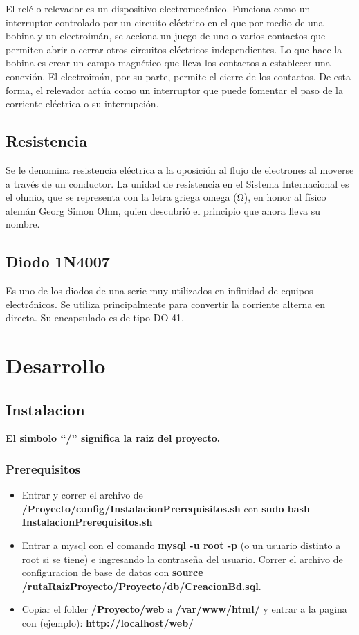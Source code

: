 \documentclass{article}
\begin{document}
El relé o relevador es un dispositivo electromecánico. Funciona como un interruptor controlado por un circuito eléctrico en el que por medio de una bobina y un electroimán, se acciona un juego de uno o varios contactos que permiten abrir o cerrar otros circuitos eléctricos independientes. Lo que hace la bobina es crear un campo magnético que lleva los contactos a establecer una conexión. El electroimán, por su parte, permite el cierre de los contactos. De esta forma, el relevador actúa como un interruptor que puede fomentar el paso de la corriente eléctrica o su interrupción. 

\subsection{Resistencia}

Se le denomina resistencia eléctrica a la oposición al flujo de electrones al moverse a través de un conductor. La unidad de resistencia en el Sistema Internacional es el ohmio, que se representa con la letra griega omega (Ω), en honor al físico alemán Georg Simon Ohm, quien descubrió el principio que ahora lleva su nombre.

\subsection{Diodo 1N4007}

Es uno de los diodos de una serie muy utilizados en infinidad de equipos electrónicos. Se utiliza principalmente para convertir la corriente alterna en directa. Su encapsulado es de tipo DO-41. 

\newpage
\section{Desarrollo}

\subsection{Instalacion}
\textbf{El simbolo ``/'' significa la raiz del proyecto.}

\subsubsection{Prerequisitos}

\begin{itemize}
	\item Entrar y correr el archivo de \textbf{/Proyecto/config/InstalacionPrerequisitos.sh} con \textbf{sudo bash InstalacionPrerequisitos.sh}
	\item Entrar a mysql con el comando \textbf{mysql -u root -p} (o un usuario distinto a root si se tiene) e ingresando la contrase\~na del usuario. Correr el archivo de configuracion de base de datos con \textbf{source /rutaRaizProyecto/Proyecto/db/CreacionBd.sql}.
	\item Copiar el folder \textbf{/Proyecto/web} a \textbf{/var/www/html/} y entrar a la pagina con (ejemplo): \textbf{http://localhost/web/}
\end{itemize}
\end{document}
